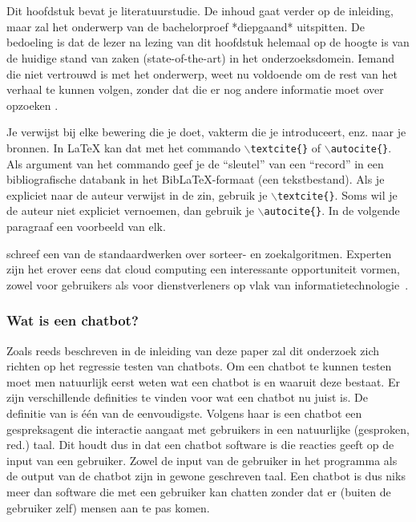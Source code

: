 \chapter{}
\label{ch:stand-van-zaken}



Dit hoofdstuk bevat je literatuurstudie. De inhoud gaat verder op de inleiding, maar zal het onderwerp van de bachelorproef *diepgaand* uitspitten. De bedoeling is dat de lezer na lezing van dit hoofdstuk helemaal op de hoogte is van de huidige stand van zaken (state-of-the-art) in het onderzoeksdomein. Iemand die niet vertrouwd is met het onderwerp, weet nu voldoende om de rest van het verhaal te kunnen volgen, zonder dat die er nog andere informatie moet over opzoeken \autocite{Pollefliet2011}.

Je verwijst bij elke bewering die je doet, vakterm die je introduceert, enz. naar je bronnen. In \LaTeX{} kan dat met het commando \texttt{$\backslash${textcite\{\}}} of \texttt{$\backslash${autocite\{\}}}. Als argument van het commando geef je de ``sleutel'' van een ``record'' in een bibliografische databank in het Bib\LaTeX{}-formaat (een tekstbestand). Als je expliciet naar de auteur verwijst in de zin, gebruik je \texttt{$\backslash${}textcite\{\}}.
Soms wil je de auteur niet expliciet vernoemen, dan gebruik je \texttt{$\backslash${}autocite\{\}}. In de volgende paragraaf een voorbeeld van elk.

\textcite{Knuth1998} schreef een van de standaardwerken over sorteer- en zoekalgoritmen. Experten zijn het erover eens dat cloud computing een interessante opportuniteit vormen, zowel voor gebruikers als voor dienstverleners op vlak van informatietechnologie~\autocite{Creeger2009}.

\lipsum[7-20]

\subsection{Wat is een chatbot?}

Zoals reeds beschreven in de inleiding van deze paper zal dit onderzoek zich richten op het regressie testen van chatbots. Om een chatbot te kunnen testen moet men natuurlijk eerst weten wat een chatbot is en waaruit deze bestaat. Er zijn verschillende definities te vinden voor wat een chatbot nu juist is. De definitie van \textcite{AbuShawar2015} is één van de eenvoudigste. Volgens haar is een chatbot een gespreksagent die interactie aangaat met gebruikers in een natuurlijke (gesproken, red.) taal. Dit houdt dus in dat een chatbot software is die reacties geeft op de input van een gebruiker. Zowel de input van de gebruiker in het programma als de output van de chatbot zijn in gewone geschreven taal. Een chatbot is dus niks meer dan software die met een gebruiker kan chatten zonder dat er (buiten de gebruiker zelf) mensen aan te pas komen. 

